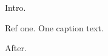 \documentclass{article}
\newenvironment{refs}{\par}{\par}
\begin{document}
Intro.
\begin{refs}
Ref one.
\figure One caption text.
\end{refs}
After.
\end{document}
